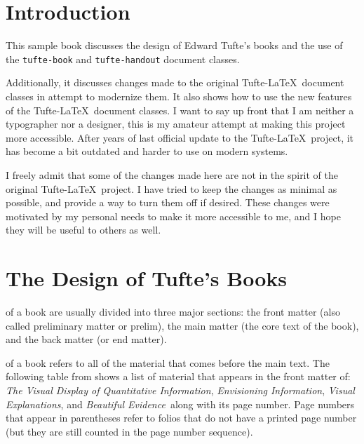 \documentclass[a4paper]{tufte-book}
\newcommand{\VDQI}{\textit{The Visual Display of Quantitative Information}\xspace}
\newcommand{\EI}{\textit{Envisioning Information}\xspace}
\newcommand{\VE}{\textit{Visual Explanations}\xspace}
\newcommand{\BE}{\textit{Beautiful Evidence}\xspace}
\newcommand{\TL}{Tufte-\LaTeX\xspace}
\newcommand{\doccls}[1]{\texttt{#1}}
\begin{document}
\vfill
\vfill


\cleardoublepage
\chapter*{Introduction}
\thispagestyle{fancy}

This sample book discusses the design of Edward Tufte's books%
\cite{Tufte2001,Tufte1990,Tufte1997,Tufte2006}
and the use of the \doccls{tufte-book} and \doccls{tufte-handout} document classes.

Additionally, it discusses changes made to the original \TL~document classes in attempt to modernize them.
It also shows how to use the new features of the \TL~document classes.
I want to say up front that I am neither a typographer nor a designer, this is my amateur attempt at making this project more accessible.
After years of last official update to the \TL~project, it has become a bit outdated and harder to use on modern systems.

I freely admit that some of the changes made here are not in the spirit of the original \TL~project.
I have tried to keep the changes as minimal as possible, and provide a way to turn them off if desired.
These changes were motivated by my personal needs to make it more accessible to me, and I hope they will be useful to others as well.


\mainmatter


\chapter{The Design of Tufte's Books}\label{ch:tufte-design}
 of a book are usually divided into three major sections:
the front matter (also called preliminary matter or prelim),
the main matter (the core text of the book),
and the back matter (or end matter).

 of a book refers to all of the material that comes before the main text.
The following table from shows a list of material that appears in the front matter of: \VDQI, \EI, \VE, and \BE~along with its page number.
Page numbers that appear in parentheses refer to folios that do not have a printed page number (but they are still counted in the page number sequence).
\end{document}
